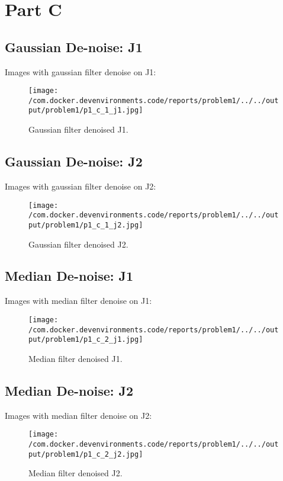 \documentclass{article}%
\begin{document}
%
\newpage%
\section{Part C}%
\label{sec:PartC}%
\subsection{Gaussian De{-}noise: J1}%
\label{subsec:GaussianDe{-}noiseJ1}%
Images with gaussian filter denoise on J1:%


\begin{figure}[h!]%
\centering%
\texttt{[image: /com.docker.devenvironments.code/reports/problem1/../../output/problem1/p1\_c\_1\_j1.jpg]}%
\caption{Gaussian filter denoised J1.}%
\end{figure}

%
\subsection{Gaussian De{-}noise: J2}%
\label{subsec:GaussianDe{-}noiseJ2}%
Images with gaussian filter denoise on J2:%


\begin{figure}[h!]%
\centering%
\texttt{[image: /com.docker.devenvironments.code/reports/problem1/../../output/problem1/p1\_c\_1\_j2.jpg]}%
\caption{Gaussian filter denoised J2.}%
\end{figure}

%
\subsection{Median De{-}noise: J1}%
\label{subsec:MedianDe{-}noiseJ1}%
Images with median filter denoise on J1:%


\begin{figure}[h!]%
\centering%
\texttt{[image: /com.docker.devenvironments.code/reports/problem1/../../output/problem1/p1\_c\_2\_j1.jpg]}%
\caption{Median filter denoised J1.}%
\end{figure}

%
\subsection{Median De{-}noise: J2}%
\label{subsec:MedianDe{-}noiseJ2}%
Images with median filter denoise on J2:%


\begin{figure}[h!]%
\centering%
\texttt{[image: /com.docker.devenvironments.code/reports/problem1/../../output/problem1/p1\_c\_2\_j2.jpg]}%
\caption{Median filter denoised J2.}%
\end{figure}
\end{document}
